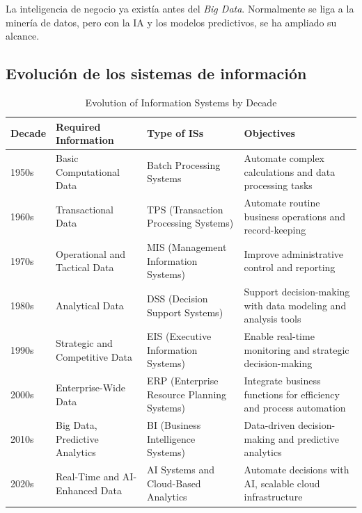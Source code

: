 La inteligencia de negocio ya existía antes del \textit{Big Data}. Normalmente se liga a la minería de datos, pero con la IA y los modelos predictivos, se ha ampliado su alcance. 

\subsection{Evolución de los sistemas de información}

\begin{table}[ht]
\centering
\begin{tabular}{p{1.5cm}p{3.5cm}p{3.5cm}p{4cm}}
\hline
\rowcolor{gray!50}
\textbf{Decade} & \textbf{Required Information} & \textbf{Type of ISs} & \textbf{Objectives} \\ \hline
\footnotesize 1950s & \footnotesize Basic Computational Data & \footnotesize Batch Processing Systems & \footnotesize Automate complex calculations and data processing tasks \\ \hline
\rowcolor{gray!10} \footnotesize 1960s & \footnotesize Transactional Data & \footnotesize TPS (Transaction Processing Systems) & \footnotesize Automate routine business operations and record-keeping \\ \hline
\footnotesize 1970s & \footnotesize Operational and Tactical Data & \footnotesize MIS (Management Information Systems) & \footnotesize Improve administrative control and reporting \\ \hline
\rowcolor{gray!10}\footnotesize 1980s & \footnotesize Analytical Data & \footnotesize DSS (Decision Support Systems) & \footnotesize Support decision-making with data modeling and analysis tools \\ \hline
\footnotesize 1990s & \footnotesize Strategic and Competitive Data & \footnotesize EIS (Executive Information Systems) & \footnotesize Enable real-time monitoring and strategic decision-making \\ \hline
\rowcolor{gray!10}\footnotesize 2000s & \footnotesize Enterprise-Wide Data & \footnotesize ERP (Enterprise Resource Planning Systems) & \footnotesize Integrate business functions for efficiency and process automation \\ \hline
\footnotesize 2010s & \footnotesize Big Data, Predictive Analytics & \footnotesize BI (Business Intelligence Systems) & \footnotesize Data-driven decision-making and predictive analytics \\ \hline
\rowcolor{gray!10}\footnotesize 2020s & \footnotesize Real-Time and AI-Enhanced Data & \footnotesize AI Systems and Cloud-Based Analytics & \footnotesize Automate decisions with AI, scalable cloud infrastructure \\ \hline
\end{tabular}
\caption{Evolution of Information Systems by Decade}
\end{table}

